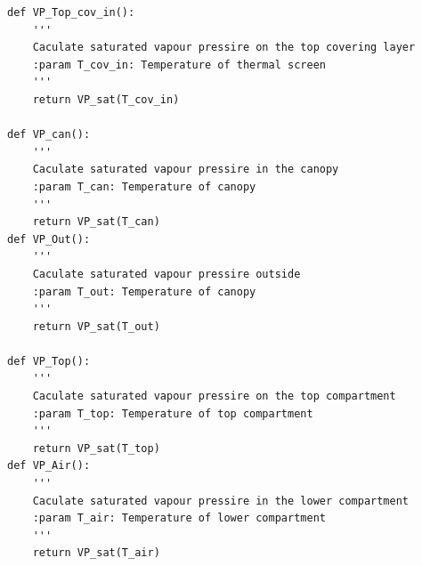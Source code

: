 \documentclass[a4paper]{article}
\begin{document}
\begin{appendices}
\begin{verbatim}
def VP_Top_cov_in():
    '''
	Caculate saturated vapour pressire on the top covering layer
	:param T_cov_in: Temperature of thermal screen		
	'''
    return VP_sat(T_cov_in)

def VP_can():
    '''
	Caculate saturated vapour pressire in the canopy
	:param T_can: Temperature of canopy		
	'''
    return VP_sat(T_can)
def VP_Out():
    '''
	Caculate saturated vapour pressire outside
	:param T_out: Temperature of canopy		
	'''
    return VP_sat(T_out)

def VP_Top():
    '''
	Caculate saturated vapour pressire on the top compartment
	:param T_top: Temperature of top compartment
	'''
    return VP_sat(T_top) 
def VP_Air():
    '''
	Caculate saturated vapour pressire in the lower compartment
	:param T_air: Temperature of lower compartment		
	'''
    return VP_sat(T_air)


\end{verbatim}
\end{appendices}

\newpage 


\printbibliography[heading=bibintoc, title=Tài liệu tham khảo]
\end{document}
